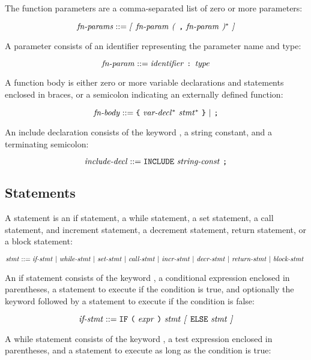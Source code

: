 \documentclass[10pt]{article}
\begin{document}
\noindent
The function parameters are a comma-separated list of zero or more
parameters:

$$\mbox{\textit{fn-params}} ::= \mbox{\textit{[} \ensuremath{\mbox{\textit{fn-param}}} \textit{(} \texttt{,}
    \ensuremath{\mbox{\textit{fn-param}}} \textit{)}$^*$ \textit{]}}$$

\noindent
A parameter consists of an identifier representing the parameter name
and type:

$$\mbox{\textit{fn-param}} ::= \mbox{\ensuremath{\mbox{\textit{identifier}}} \texttt{:}
  \ensuremath{\mbox{\textit{type}}}}$$

\noindent
A function body is either zero or more variable declarations and
statements enclosed in braces, or a semicolon indicating an externally
defined function:

$$\mbox{\textit{fn-body}} ::= \mbox{\texttt{\{} \ensuremath{\mbox{\textit{var-decl}}}$^*$
  \ensuremath{\mbox{\textit{stmt}}}$^*$ \texttt{\}} $|$ \texttt{;}}$$

 An include declaration consists of the
keyword , a string constant, and a terminating semicolon:

$$\mbox{\textit{include-decl}} ::= \mbox{\texttt{INCLUDE}
  \ensuremath{\mbox{\textit{string-const}}} \texttt{;}}$$

\subsection{Statements}
\label{sec:syntax:statements}

A statement is an if statement, a while statement, a set statement, a
call statement, and increment statement, a decrement statement, return
statement, or a block statement:

$$\mbox{\textit{stmt}} ::= \mbox{\ensuremath{\mbox{\textit{if-stmt}}} $|$ \ensuremath{\mbox{\textit{while-stmt}}}
  $|$ \ensuremath{\mbox{\textit{set-stmt}}} $|$ \ensuremath{\mbox{\textit{call-stmt}}} $|$
  \ensuremath{\mbox{\textit{incr-stmt}}} $|$ \ensuremath{\mbox{\textit{decr-stmt}}} $|$
  \ensuremath{\mbox{\textit{return-stmt}}} $|$ \ensuremath{\mbox{\textit{block-stmt}}} }$$

 An if statement consists of the keyword
, a conditional expression enclosed in parentheses, a
statement to execute if the condition is true, and optionally the
keyword  followed by a statement to execute if the condition
is false:

$$\mbox{\textit{if-stmt}} ::= \mbox{\texttt{IF} \texttt{(} \ensuremath{\mbox{\textit{expr}}} \texttt{)}
  \ensuremath{\mbox{\textit{stmt}}} \textit{[} \texttt{ELSE} \ensuremath{\mbox{\textit{stmt}}} \textit{]}}$$

 A while statement consists of the keyword
, a test expression enclosed in parentheses, and a
statement to execute as long as the condition is true:
\end{document}
